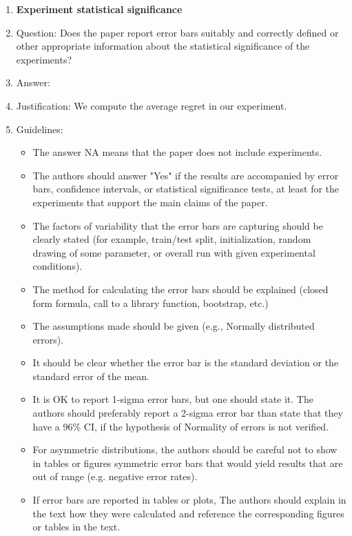 \documentclass{article}
\theoremstyle{definition}
\begin{document}
\begin{enumerate}
\item {\bf Experiment statistical significance}
    \item[] Question: Does the paper report error bars suitably and correctly defined or other appropriate information about the statistical significance of the experiments?
    \item[] Answer: \answerYes{} %
    \item[] Justification: We compute the average regret in our experiment.
    \item[] Guidelines:
    \begin{itemize}
        \item The answer NA means that the paper does not include experiments.
        \item The authors should answer "Yes" if the results are accompanied by error bars, confidence intervals, or statistical significance tests, at least for the experiments that support the main claims of the paper.
        \item The factors of variability that the error bars are capturing should be clearly stated (for example, train/test split, initialization, random drawing of some parameter, or overall run with given experimental conditions).
        \item The method for calculating the error bars should be explained (closed form formula, call to a library function, bootstrap, etc.)
        \item The assumptions made should be given (e.g., Normally distributed errors).
        \item It should be clear whether the error bar is the standard deviation or the standard error of the mean.
        \item It is OK to report 1-sigma error bars, but one should state it. The authors should preferably report a 2-sigma error bar than state that they have a 96\% CI, if the hypothesis of Normality of errors is not verified.
        \item For asymmetric distributions, the authors should be careful not to show in tables or figures symmetric error bars that would yield results that are out of range (e.g. negative error rates).
        \item If error bars are reported in tables or plots, The authors should explain in the text how they were calculated and reference the corresponding figures or tables in the text.
    \end{itemize}


\end{enumerate}
\end{document}
